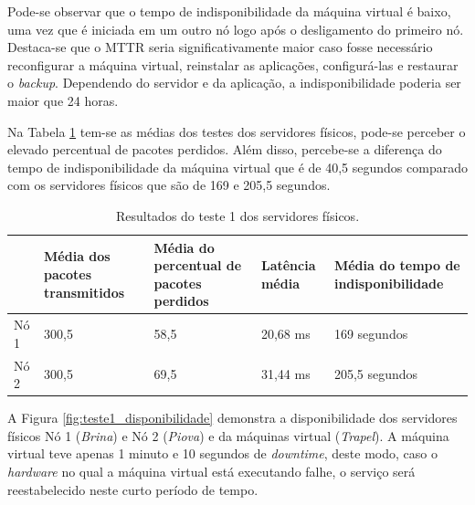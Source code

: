 Pode-se observar que o tempo de indisponibilidade da máquina virtual é baixo, uma vez que é iniciada em um outro nó logo após o desligamento do 
primeiro nó. Destaca-se que o \ac{MTTR} seria significativamente maior caso fosse necessário reconfigurar a máquina virtual, reinstalar as 
aplicações, configurá-las e restaurar o \textit{backup}. Dependendo do servidor e da aplicação, a indisponibilidade poderia ser maior que 24 horas.

Na Tabela \ref{tab:teste1resultados} tem-se as médias dos testes dos servidores físicos, pode-se perceber o elevado percentual de pacotes perdidos. 
Além disso, percebe-se a diferença do tempo de indisponibilidade da máquina virtual que é de 40,5 segundos comparado com os servidores 
físicos que são de 169 e 205,5 segundos.

\begin{table}[h!]
\caption{Resultados do teste 1 dos servidores físicos.}
\label{tab:teste1resultados}
\begin{center}
\begin{tabular}{|l|p{2.2cm}|p{2.5cm}|p{2cm}|p{2.7cm}|}\hline
 & \textbf{Média dos pacotes transmitidos} & \textbf{Média do percentual de pacotes perdidos} & \textbf{Latência média} & \textbf{Média do tempo de indisponibilidade} \\\hline
Nó 1 & 300,5 & 58,5 & 20,68 ms & 169 segundos \\\hline
Nó 2 & 300,5 & 69,5 & 31,44 ms & 205,5 segundos \\\hline
\end{tabular}
\end{center}
\end{table}

A Figura \ref{fig:teste1_disponibilidade} demonstra a disponibilidade dos servidores físicos Nó 1 (\textit{Brina}) e Nó 2 (\textit{Piova}) e da 
máquinas virtual (\textit{Trapel}). A máquina virtual teve apenas 1 minuto e 10 segundos de \textit{downtime}, deste modo, caso o 
\textit{hardware} no qual a máquina virtual está executando falhe, o serviço será reestabelecido neste curto período de tempo.

